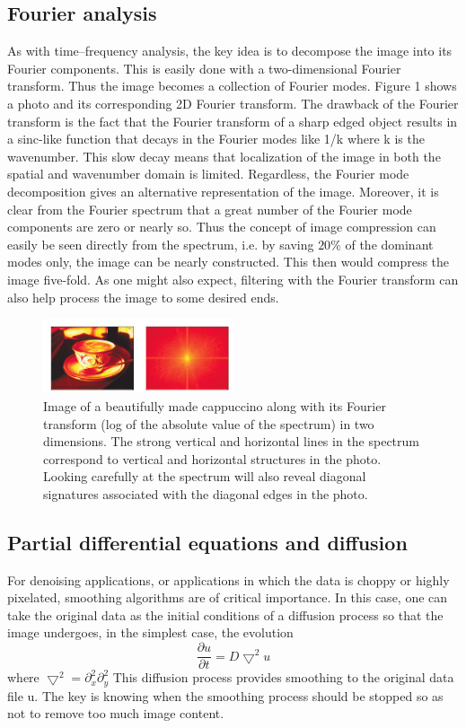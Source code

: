 \documentclass[12pt,letterpaper]{article}
\begin{document}
\subsection{Fourier analysis}
As with time–frequency analysis, the key idea is to decompose the image into its Fourier components.
This is easily done with a two-dimensional Fourier transform. Thus the image becomes
a collection of Fourier modes. Figure 1 shows a photo and its corresponding 2D Fourier transform.
The drawback of the Fourier transform is the fact that the Fourier transform of a sharp 
edged object results in a sinc-like function that decays in the Fourier modes like 1/k where k is
the wavenumber. This slow decay means that localization of the image in both the spatial and
wavenumber domain is limited. Regardless, the Fourier mode decomposition gives an alternative
representation of the image. Moreover, it is clear from the Fourier spectrum that a great number
of the Fourier mode components are zero or nearly so. Thus the concept of image compression
can easily be seen directly from the spectrum, i.e. by saving $ 20\% $ of the dominant modes only, the image can be nearly constructed. This then would compress the image five-fold. As one might also expect, filtering with the Fourier transform can also help process the image to some desired ends.
\begin{figure}[h]
	\caption{Image of a beautifully made cappuccino along with its Fourier transform (log of the absolute
		value of the spectrum) in two dimensions. The strong vertical and horizontal lines in the spectrum correspond
		to vertical and horizontal structures in the photo. Looking carefully at the spectrum will also reveal
		diagonal signatures associated with the diagonal edges in the photo.}
	\centering
	\includegraphics[width=0.5\textwidth]{book1}
\end{figure}


\subsection{Partial differential equations and diffusion}
For denoising applications, or applications in which the data is choppy or highly pixelated,
smoothing algorithms are of critical importance. In this case, one can take the original data as
the initial conditions of a diffusion process so that the image undergoes, in the simplest case, the evolution
\begin{equation}
\frac{\partial u}{\partial t} = D \bigtriangledown ^2 u
\end{equation}
where $\bigtriangledown ^2 = \partial_x ^2 \partial_y ^2$ This diffusion process provides smoothing to the original data file u. The
key is knowing when the smoothing process should be stopped so as not to remove too much
image content.
\end{document}
